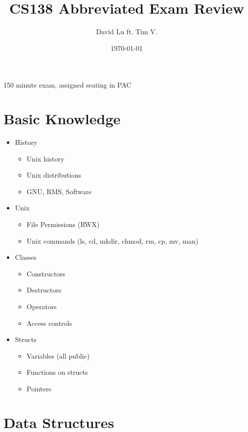 \documentclass{article}
\begin{document}
\title{CS138 Abbreviated Exam Review}
\date{\today}
\author{David Lu ft. Tim V.}

\maketitle

150 minute exam, assigned seating in PAC

\begin{multicols}{2}
\section{Basic Knowledge}

\begin{itemize}
	\item{History}
	\begin{itemize}
		\item{Unix history}
		\item{Unix distributions}
		\item{GNU, RMS, Software}
	\end{itemize}
	\item{Unix}
	\begin{itemize}
		\item{File Permissions (RWX)}
		\item{Unix commands (ls, cd, mkdir, chmod, rm, cp, mv, man)}
	\end{itemize}
	\item{Classes}
	\begin{itemize}
		\item{Constructors}
		\item{Destructors}
		\item{Operators}
		\item{Access controls}
	\end{itemize}
	\item{Structs}
	\begin{itemize}
		\item{Variables (all public)}
		\item{Functions on structs}
		\item{Pointers}
	\end{itemize}
\end{itemize}

\section{Data Structures}


\end{multicols}
\end{document}
